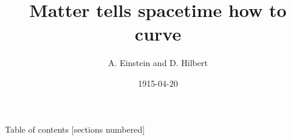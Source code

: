 \documentclass[aspectratio=169]{beamer}
\title{Matter tells spacetime how to curve}
\date{1915-04-20}
\author{A. Einstein and D. Hilbert}
\institute{A faculty (not a bathing establishment)}
\begin{document}
\begin{frame}
  \titlepage
\end{frame}

\begin{frame}{Table of contents}
  [sections numbered]
  \tableofcontents[hideallsubsections]
\end{frame}



\begin{frame}
  \printbibliography
\end{frame}
\end{document}
